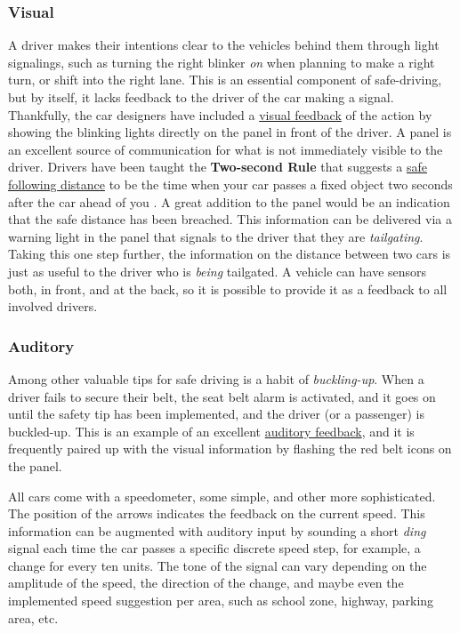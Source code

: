 \documentclass[12pt,letterpaper]{article}
\begin{document}
\subsubsection*{Visual}
A driver makes their intentions clear to the vehicles behind them through light signalings, such as turning the right blinker \textit{on} when planning to make a right turn, or shift into the right lane. This is an essential component of safe-driving, but by itself, it lacks feedback to the driver of the car making a signal. Thankfully, the car designers have included a \underline{visual feedback} of the action by showing the blinking lights directly on the panel in front of the driver. A panel is an excellent source of communication for what is not immediately visible to the driver. Drivers have been taught the \textbf{Two-second Rule} that suggests a \underline{safe following distance} to be the time when your car passes a fixed object two seconds after the car ahead of you \cite{wiki:driving_tips}. A great addition to the panel would be an indication that the safe distance has been breached. This information can be delivered via a warning light in the panel that signals to the driver that they are \textit{tailgating}. Taking this one step further, the information on the distance between two cars is just as useful to the driver who is \textit{being} tailgated. A vehicle can have sensors both, in front, and at the back, so it is possible to provide it as a feedback to all involved drivers. 

\subsubsection*{Auditory}
Among other valuable tips for safe driving is a habit of \textit{buckling-up}. When a driver fails to secure their belt, the seat belt alarm is activated, and it goes on until the safety tip has been implemented, and the driver (or a passenger) is buckled-up. This is an example of an excellent \underline{auditory feedback}, and it is frequently paired up with the visual information by flashing the red belt icons on the panel.

All cars come with a speedometer, some simple, and other more sophisticated. The position of the arrows indicates the feedback on the current speed. This information can be augmented with auditory input by sounding a short \textit{ding} signal each time the car passes a specific discrete speed step, for example, a change for every ten units. The tone of the signal can vary depending on the amplitude of the speed, the direction of the change, and maybe even the implemented speed suggestion per area, such as school zone, highway, parking area, etc. 
\end{document}
